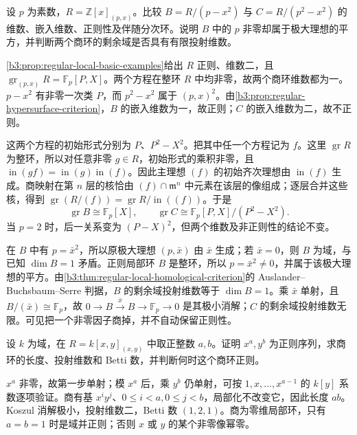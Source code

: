 \begin{exercise}\label{b3:ex:18-mixed-characteristic-graded}
	设 \(p\) 为素数，\(R=\mathbb Z[x]_{(p,x)}\)。比较 \(B=R/(p-x^2)\) 与 \(C=R/(p^2-x^2)\) 的维数、嵌入维数、正则性及伴随分次环。说明 \(B\) 中的 \(p\) 非零却属于极大理想的平方，并判断两个商环的剩余域是否具有有限投射维数。
\end{exercise}
\begin{solution}
	\cref{b3:prop:regular-local-basic-examples}给出 \(R\) 正则、维数二，且 \(\operatorname{gr}_{(p,x)}R=\mathbb F_p[P,X]\)。两个方程在整环 \(R\) 中均非零，故两个商环维数都为一。\(p-x^2\) 有非零一次类 \(P\)，而 \(p^2-x^2\) 属于 \((p,x)^2\)。由\cref{b3:prop:regular-hypersurface-criterion}，\(B\) 的嵌入维数为一，故正则；\(C\) 的嵌入维数为二，故不正则。

	这两个方程的初始形式分别为 \(P\)、\(P^2-X^2\)。把其中任一个方程记为 \(f\)。这里 \(\operatorname{gr}R\) 为整环，所以对任意非零 \(g\in R\)，初始形式的乘积非零，且 \(\operatorname{in}(gf)=\operatorname{in}(g)\operatorname{in}(f)\)。因此主理想 \((f)\) 的初始齐次理想由 \(\operatorname{in}(f)\) 生成。商映射在第 \(n\) 层的核恰由 \((f)\cap\mathfrak m^n\) 中元素在该层的像组成；逐层合并这些核，得到 \(\operatorname{gr}(R/(f))=\operatorname{gr}R/\operatorname{in}((f))\)。于是
	\[
		\operatorname{gr}B\cong\mathbb F_p[X],\qquad \operatorname{gr}C\cong\mathbb F_p[P,X]/(P^2-X^2).
	\]
	当 \(p=2\) 时，后一关系变为 \((P-X)^2\)，但两个维数及非正则性的结论不变。

	在 \(B\) 中有 \(p=\bar x^2\)，所以原极大理想 \((p,\bar x)\) 由 \(\bar x\) 生成；若 \(\bar x=0\)，则 \(B\) 为域，与已知 \(\dim B=1\) 矛盾。正则局部环 \(B\) 是整环，所以 \(p=\bar x^2\ne0\)，并属于该极大理想的平方。由\cref{b3:thm:regular-local-homological-criterion}的 Auslander–Buchsbaum–Serre 判据，\(B\) 的剩余域投射维数等于 \(\dim B=1\)。乘 \(\bar x\) 单射，且 \(B/(\bar x)\cong\mathbb F_p\)，故 \(0\to B\xrightarrow{\bar x}B\to\mathbb F_p\to0\) 是其极小消解；\(C\) 的剩余域投射维数无限。可见把一个非零因子商掉，并不自动保留正则性。
\end{solution}

\begin{exercise}\label{b3:ex:18-parameter-powers-length}
	设 \(k\) 为域，在 \(R=k[x,y]_{(x,y)}\) 中取正整数 \(a,b\)。证明 \(x^a,y^b\) 为正则序列，求商环的长度、投射维数和 Betti 数，并判断何时这个商环正则。
\end{exercise}
\begin{solution}
	\(x^a\) 非零，故第一步单射；模 \(x^a\) 后，乘 \(y^b\) 仍单射，可按 \(1,x,\ldots,x^{a-1}\) 的 \(k[y]\) 系数逐项验证。商有基 \(x^iy^j\)、\(0\le i<a,0\le j<b\)，局部化不改变它，因此长度 \(ab\)。Koszul 消解极小，投射维数二，Betti 数 \((1,2,1)\)。商为零维局部环，只有 \(a=b=1\) 时是域并正则；否则 \(x\) 或 \(y\) 的某个非零像幂零。
\end{solution}

